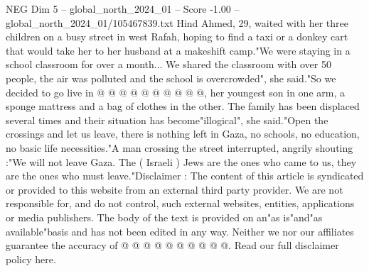 \begin{textsample}{NEG Dim 5 – global\_north\_2024\_01 – Score -1.00 – global\_north\_2024\_01/105467839.txt}
Hind Ahmed, 29, waited with her three children on a busy street in west Rafah, hoping to find a taxi or a donkey cart that would take her to her husband at a makeshift camp."We were staying in a school classroom for over a month...
We shared the classroom with over 50 people, the air was polluted and the school is overcrowded", she said."So we decided to go live in @ @ @ @ @ @ @ @ @ @, her youngest son in one arm, a sponge mattress and a bag of clothes in the other.
The family has been displaced several times and their situation has become"illogical", she said."Open the crossings and let us leave, there is nothing left in Gaza, no schools, no education, no basic life necessities."A man crossing the street interrupted, angrily shouting :"We will not leave Gaza.
The ( Israeli ) Jews are the ones who came to us, they are the ones who must leave."Disclaimer : The content of this article is syndicated or provided to this website from an external third party provider.
We are not responsible for, and do not control, such external websites, entities, applications or media publishers.
The body of the text is provided on an"as is"and"as available"basis and has not been edited in any way.
Neither we nor our affiliates guarantee the accuracy of @ @ @ @ @ @ @ @ @ @.
Read our full disclaimer policy here.

\end{textsample}
